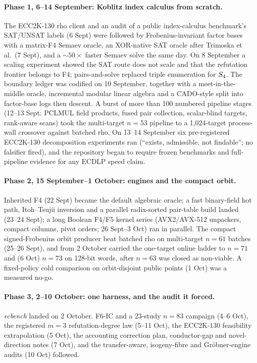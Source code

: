 \paragraph{Phase 1, 6--14 September: Koblitz index calculus from
scratch.} The ECC2K-130 rho client and an audit of a public
index-calculus benchmark's SAT/UNSAT labels (6 Sept) were followed by
Frobenius-invariant factor bases with a matrix-F4 Semaev oracle, an
XOR-native SAT oracle after Trimoska et al.\ (7 Sept), and a $\sim50\times$
faster Semaev solve the same day. On 8 September a scaling experiment
showed the SAT route does not scale and that the refutation frontier
belongs to F4; pairs-and-solve replaced triple enumeration for
$S_{4}$. The boundary ledger was codified on 10 September, together with
a meet-in-the-middle oracle, incremental modular linear algebra and a
CADO-style split into factor-base logs then descent. A burst of more than
100 numbered pipeline stages (12--13 Sept: PCLMUL field products, fused
pair collection, scalar-blind targets, rank-aware scans) took the
multi-target $n=53$ pipeline to a 1{,}024-target process-wall crossover
against batched rho. On 13--14 September six pre-registered ECC2K-130
decomposition experiments ran (``exists, admissible, not findable''; no
falsifier fired), and the repository began to require frozen benchmarks
and full-pipeline evidence for any ECDLP speed claim.

\paragraph{Phase 2, 15 September--1 October: engines and the compact
orbit.} Inherited F4 (22 Sept) became the default algebraic oracle; a fast
binary-field hot path, Itoh--Tsujii inversion and a parallel radix-sorted
pair-table build landed (23--24 Sept); a long Boolean F4/F5 kernel series
(AVX2/AVX-512 unpackers, compact columns, pivot orders; 26 Sept--3 Oct)
ran in parallel. The compact signed-Frobenius orbit producer beat batched rho on
multi-target $n=61$ batches (25--26 Sept), and from 2 October carried the
one-target online ladder to $n=71$ and (6 Oct) $n=73$ on 128-bit words,
after $n=63$ was closed as non-viable. A fixed-policy
cold comparison on orbit-disjoint public points (1 Oct) was a measured
no-go.

\paragraph{Phase 3, 2--10 October: one harness, and the audit it
forced.} \emph{ecbench} landed on 2 October. F6-IC and a 23-study $n=83$
campaign (4--6 Oct), the registered $m=3$ refutation-degree law (5--11
Oct), the ECC2K-130 feasibility extrapolation (5 Oct), the accounting
correction plan, conductor-gap and novel-direction notes (7 Oct), and the
transfer-aware, isogeny-fibre and Gr\"obner-engine audits (10 Oct)
followed.


